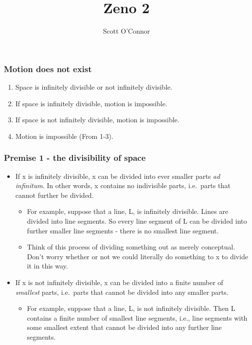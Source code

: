\documentclass[]{article}
\title{Zeno 2}
\author{Scott O'Connor}
\date{ }
\begin{document}
\maketitle

\subsubsection{Motion does not exist}\label{motion-does-not-exist}

\begin{enumerate}
\def\labelenumi{\arabic{enumi}.}
\item
  Space is infinitely divisible or not infinitely divisible.
\item
  If space is infinitely divisible, motion is impossible.
\item
  If space is not infinitely divisible, motion is impossible.
\item
  Motion is impossible (From 1-3).
\end{enumerate}

\subsubsection{Premise 1 - the divisibility of
space}\label{premise-1---the-divisibility-of-space}

\begin{itemize}
\item
  If x is infinitely divisible, x can be divided into ever smaller parts
  \emph{ad infinitum}. In other words, x contains no indivisible parts,
  i.e.~parts that cannot further be divided.

  \begin{itemize}
  \item
    For example, suppose that a line, L, is infinitely divisible. Lines
    are divided into line segments. So every line segment of L can be
    divided into further smaller line segments - there is no smallest
    line segment.
  \item
    Think of this process of dividing something out as merely
    conceptual. Don't worry whether or not we could literally do
    something to x to divide it in this way.
  \end{itemize}
\item
  If x is not infinitely divisible, x can be divided into a finite
  number of \emph{smallest} parts, i.e.~parts that cannot be divided
  into any smaller parts.

  \begin{itemize}
  \itemsep1pt\parskip0pt
  \item
    For example, suppose that a line, L, is not infinitely divisible.
    Then L contains a finite number of smallest line segments, i.e.,
    line segments with some smallest extent that cannot be divided into
    any further line segments.
  \end{itemize}
\end{itemize}
\end{document}
